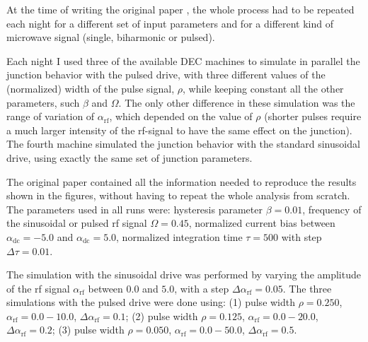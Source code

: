 

At the time of writing the original paper \cite{Maggi:1996}, the whole process had to be repeated each night for a different set of input parameters  and for a different kind of microwave signal (single, biharmonic or pulsed).

Each night I used three of the available DEC machines to simulate in parallel the junction behavior with the pulsed drive, with three different values of the (normalized) width of the pulse signal, $\rho$, while keeping constant all the other parameters, such $\beta$ and $\Omega$.
The only other difference in these simulation was the range of variation of $\alpha_\mathrm{rf}$, which depended on the value of $\rho$ (shorter pulses require a much larger intensity of the rf-signal to have the same effect on the junction).
The fourth machine simulated the junction behavior with the standard sinusoidal drive, using exactly the same set of junction parameters.

The original paper  contained all the information needed to reproduce the results shown in the figures, without having to repeat the whole analysis from scratch. 
The parameters used in all runs were: hysteresis parameter $\beta = 0.01$, frequency of the sinusoidal or pulsed  rf signal $\Omega = 0.45$, normalized current bias between $\alpha_\mathrm{dc} = -5.0$ and $\alpha_\mathrm{dc} = 5.0$, normalized integration time $\tau = 500$ with step $\Delta \tau = 0.01$. 

The simulation with the sinusoidal drive was performed by varying the amplitude of the rf signal $\alpha_\mathrm{rf}$ between $0.0$ and $5.0$, with a step $\Delta \alpha_\mathrm{rf} = 0.05$.
The three simulations with the pulsed drive were done using: 
(1) pulse width $\rho = 0.250$, $\alpha_\mathrm{rf} = 0.0 - 10.0$, $\Delta \alpha_\mathrm{rf} = 0.1$;
(2) pulse width $\rho = 0.125$, $\alpha_\mathrm{rf} = 0.0 - 20.0$, $\Delta \alpha_\mathrm{rf} = 0.2$;
(3) pulse width $\rho = 0.050$, $\alpha_\mathrm{rf} = 0.0 - 50.0$, $\Delta \alpha_\mathrm{rf} = 0.5$.


